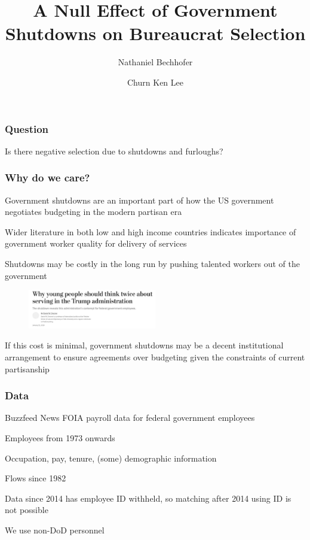 \documentclass[aspectratio=169]{beamer}
\title{A Null Effect of Government Shutdowns on Bureaucrat Selection}
\author{Nathaniel Bechhofer \and Churn Ken Lee}
\institute{UC San Diego}
\date{}
\newenvironment{wideitemize}{\itemize\addtolength{\itemsep}{10pt}}{\enditemize}
\begin{document}
\begin{frame}
    \titlepage
\end{frame}

\begin{frame}
    \frametitle{Question}

    Is there negative selection due to shutdowns and furloughs?

\end{frame}

\begin{frame}
    \frametitle{Why do we care?}

    \begin{wideitemize}
        \item Government shutdowns are an important part of how the US government negotiates budgeting in the modern partisan era
        \item Wider literature in both low  and high income countries indicates importance of government worker quality for delivery of services
        \item Shutdowns may be costly in the long run by pushing talented workers out of the government
        \begin{figure}[]
            \centering
            \includegraphics[width=0.5\textwidth]{../output/image_from_ios.jpg}
        \end{figure}
        \item If this cost is minimal, government shutdowns may be a decent institutional arrangement to ensure agreements over budgeting given the constraints of current partisanship
    \end{wideitemize}

\end{frame}

\begin{frame}
    \frametitle{Data}

    \begin{wideitemize}
        \item Buzzfeed News FOIA payroll data for federal government employees
        \item Employees from 1973 onwards
        \item Occupation, pay, tenure, (some) demographic information
        \item Flows since 1982
        \item Data since 2014 has employee ID withheld, so matching after 2014 using ID is not possible
        \item We use non-DoD personnel
    \end{wideitemize}

\end{frame}
\end{document}
